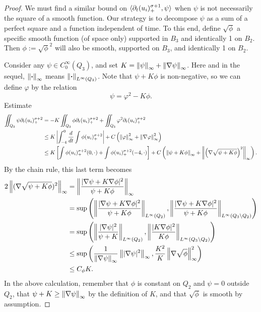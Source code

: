 \begin{proof}

We must find a similar bound on $\langle \partial_t (u_i)_+^{\sigma+1}, \psi \rangle$ when $\psi$ is not necessarily the square of a smooth function.  Our strategy is to decompose $\psi$ as a sum of a perfect square and a function independent of time.  To this end, define $\sqrt{\phi}$ a specific smooth function (of space only) supported in $B_3$ and identically 1 on $B_2$.  Then $\phi := \sqrt{\phi}^2$ will also be smooth, supported on $B_3$, and identically 1 on $B_2$.  

Consider any $\psi \in C_0^\infty(Q_3)$, and set $K = \left\lVert\psi\right\rVert_\infty + \left\lVert\nabla \psi\right\rVert_\infty$.  Here and in the sequel, $\left\lVert\boldsymbol{\cdot}\right\rVert_\infty$ means $\left\lVert\boldsymbol{\cdot}\right\rVert_{L^\infty(Q_3)}$.  Note that $\psi + K \phi$ is non-negative, so we can define $\varphi$ by the relation
\[ \psi = \varphi^2 - K \phi.\]  
Estimate
\begin{align*}
\iint_{Q_2} \psi \partial_t (u_i)_+^{\sigma+2} &= -K\iint_{Q_3}\phi \partial_t (u_i)_+^{\sigma+2} + \iint_{Q_3} \varphi^2 \partial_t (u_i)_+^{\sigma+2}
\\ &\leq K \left\lvert \int_{-4}^0 \frac{d}{dt} \int \phi (u_i)_+^{\sigma+2}  \right\rvert + C \left( \left\lVert\varphi\right\rVert_\infty^2 + \left\lVert\nabla\varphi\right\rVert_\infty^2  \right)
\\ &\leq K \left[ \int \phi (u_i)_+^{\sigma+2}(0,\cdot) + \int \phi (u_i)_+^{\sigma+2}(-4,\cdot) \right] + C \left(  \left\lVert\psi + K \phi\right\rVert_\infty + \left\lVert\left( \nabla \sqrt{\psi + K \phi}  \right)^2\right\rVert_\infty  \right).
\end{align*}
By the chain rule, this last term becomes
\begin{align*}
2 \left\lVert(\nabla \sqrt{\psi + K \phi} )^2\right\rVert_\infty &= \left\lVert\frac{|\nabla \psi + K \nabla \phi|^2}{\psi + K \phi}\right\rVert_\infty 
\\ &= \sup\left(  \left\lVert\frac{|\nabla \psi + K \nabla \phi|^2}{\psi + K \phi}\right\rVert_{L^\infty(Q_2)} , \left\lVert\frac{|\nabla \psi + K \nabla \phi|^2}{\psi + K \phi}\right\rVert_{L^\infty(Q_3 \setminus Q_2)}  \right)
\\ &= \sup\left(  \left\lVert\frac{|\nabla \psi|^2}{\psi + K}\right\rVert_{L^\infty(Q_2)} , \left\lVert\frac{|K \nabla \phi|^2}{K \phi}\right\rVert_{L^\infty(Q_3 \setminus Q_2)}  \right)
\\ &\leq \sup\left(  \frac{1}{\left\lVert\nabla \psi\right\rVert_\infty}\left\lVert|\nabla \psi|^2\right\rVert_{\infty}, \frac{K^2}{K} \left\lVert \nabla \sqrt{\phi} \right\rVert_\infty^2  \right)
\\ &\leq C_\phi K.
\end{align*}
In the above calculation, remember that $\phi$ is constant on $Q_2$ and $\psi = 0$ outside $Q_2$, that $\psi + K \geq \left\lVert\nabla \psi\right\rVert_\infty$ by the definition of $K$, and that $\sqrt{\phi}$ is smooth by assumption.  


\end{proof}
